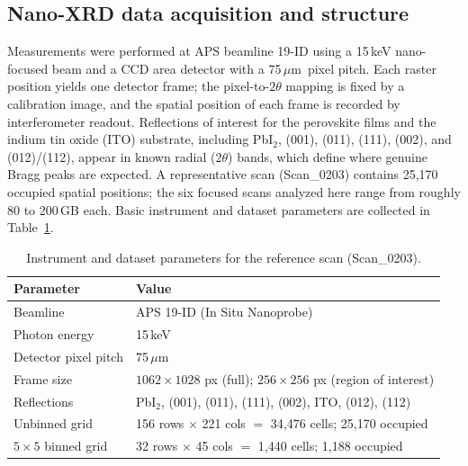 \documentclass[12pt]{article}
\newcommand{\um}{\ensuremath{\mu}m}
\begin{document}
\subsection{Nano-XRD data acquisition and structure}
Measurements were performed at APS beamline 19-ID using a 15\,keV nano-focused
beam and a CCD area detector with a 75\,\um\ pixel pitch. Each raster position
yields one detector frame; the pixel-to-$2\theta$ mapping is fixed by a
calibration image, and the spatial position of each frame is recorded by
interferometer readout. Reflections of interest for the perovskite films and the
indium tin oxide (ITO) substrate, including PbI$_2$, (001), (011), (111),
(002), and (012)/(112), appear in known radial ($2\theta$) bands, which define
where genuine Bragg peaks are expected. A representative scan (Scan\_0203)
contains 25{,}170 occupied spatial positions; the six focused scans analyzed
here range from roughly 80 to 200\,GB each. Basic instrument and dataset
parameters are collected in Table~\ref{tab:dataset}.

\begin{table}[H]
\centering
\caption{Instrument and dataset parameters for the reference scan (Scan\_0203).}
\label{tab:dataset}
\small
\begin{tabular}{@{}ll@{}}
\toprule
Parameter & Value\\
\midrule
Beamline & APS 19-ID (In Situ Nanoprobe)\\
Photon energy & 15\,keV\\
Detector pixel pitch & 75\,\um\\
Frame size & $1062\times1028$ px (full); $256\times256$ px (region of interest)\\
Reflections & PbI$_2$, (001), (011), (111), (002), ITO, (012), (112)\\
Unbinned grid & 156 rows $\times$ 221 cols $=$ 34{,}476 cells; 25{,}170 occupied\\
$5\times5$ binned grid & 32 rows $\times$ 45 cols $=$ 1{,}440 cells; 1{,}188 occupied\\
\bottomrule
\end{tabular}
\end{table}
\end{document}
